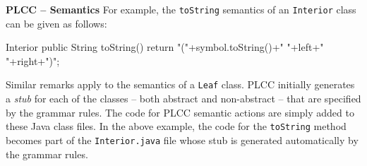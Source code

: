 \begin{minipage}[t]{\sw}
\slidenumber
\LARGE
{\bf PLCC -- Semantics}\exx
For example, the \verb'toString' semantics of an \verb'Interior' class
can be given as follows:
{\Large
\begin{qv}
Interior
    public String toString() {
         return "("+symbol.toString()+" "+left+" "+right+")";
    }
\end{qv}
}
Similar remarks apply to the semantics of a \verb'Leaf' class.\exx
PLCC initially generates a {\em stub} for each of the classes --
both abstract and non-abstract --
that are specified by the grammar rules.
The code for PLCC semantic actions are simply added
to these Java class files.
In the above example, the code for the \verb'toString' method
becomes part of the \verb'Interior.java' file
whose stub is generated automatically by the grammar rules.
\end{minipage}
\clearpage
